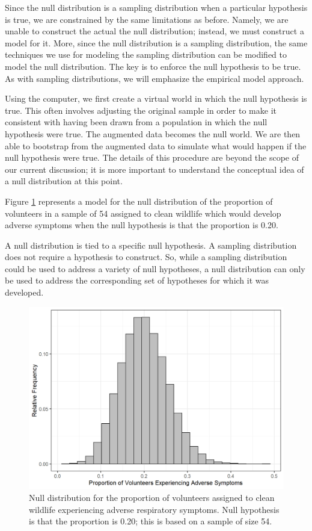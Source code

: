 \documentclass[
]{book}
\theoremstyle{plain}
\theoremstyle{mydefn}
\theoremstyle{myexmpl}
\theoremstyle{remark}
\begin{document}
Since the null distribution is a sampling distribution when a particular hypothesis is true, we are constrained by the same limitations as before. Namely, we are unable to construct the actual the null distribution; instead, we must construct a model for it. More, since the null distribution is a sampling distribution, the same techniques we use for modeling the sampling distribution can be modified to model the null distribution. The key is to enforce the null hypothesis to be true. As with sampling distributions, we will emphasize the empirical model approach.

Using the computer, we first create a virtual world in which the null hypothesis is true. This often involves adjusting the original sample in order to make it consistent with having been drawn from a population in which the null hypothesis were true. The augmented data becomes the null world. We are then able to bootstrap from the augmented data to simulate what would happen if the null hypothesis were true. The details of this procedure are beyond the scope of our current discussion; it is more important to understand the conceptual idea of a null distribution at this point.

Figure \ref{fig:nulldistns-deepwater-null} represents a model for the null distribution of the proportion of volunteers in a sample of 54 assigned to clean wildlife which would develop adverse symptoms when the null hypothesis is that the proportion is 0.20.

\begin{rmdtip}
A null distribution is tied to a specific null hypothesis. A sampling distribution does not require a hypothesis to construct. So, while a sampling distribution could be used to address a variety of null hypotheses, a null distribution can only be used to address the corresponding set of hypotheses for which it was developed.
\end{rmdtip}

\begin{figure}

{\centering \includegraphics[width=0.8\linewidth]{./Images/nulldistns-deepwater-null-1} 

}

\caption{Null distribution for the proportion of volunteers assigned to clean wildlife experiencing adverse respiratory symptoms.  Null hypothesis is that the proportion is 0.20; this is based on a sample of size 54.}\label{fig:nulldistns-deepwater-null}
\end{figure}
\end{document}
